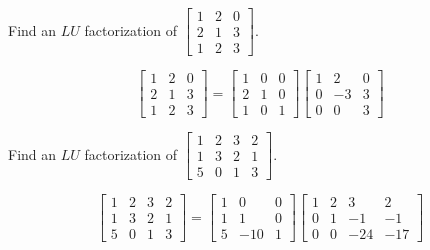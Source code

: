 \documentclass{ximera}
\begin{document}
\begin{problem}\label{prb:4.61} Find an $LU$ factorization of $\left[
\begin{array}{rrr}
1 & 2 & 0 \\
2 & 1 & 3 \\
1 & 2 & 3
\end{array}
\right] .$
\begin{hint}
\[
\left[
\begin{array}{ccc}
1 & 2 & 0 \\
2 & 1 & 3 \\
1 & 2 & 3
\end{array}
\right] = \left[
\begin{array}{ccc}
1 & 0 & 0 \\
2 & 1 & 0 \\
1 & 0 & 1
\end{array}
\right] \left[
\begin{array}{rrr}
1 & 2 & 0 \\
0 & -3 & 3 \\
0 & 0 & 3
\end{array}
\right]
\]

\end{hint}
\end{problem}

\begin{problem}\label{prb:4.62} Find an $LU$ factorization of $\left[
\begin{array}{rrrr}
1 & 2 & 3 & 2 \\
1 & 3 & 2 & 1 \\
5 & 0 & 1 & 3
\end{array}
\right] .$
\begin{hint}
\[
\left[
\begin{array}{cccc}
1 & 2 & 3 & 2 \\
1 & 3 & 2 & 1 \\
5 & 0 & 1 & 3
\end{array}
\right] = \left[
\begin{array}{rrr}
1 & 0 & 0 \\
1 & 1 & 0 \\
5 & -10 & 1
\end{array}
\right] \left[
\begin{array}{rrrr}
1 & 2 & 3 & 2 \\
0 & 1 & -1 & -1 \\
0 & 0 & -24 & -17
\end{array}
\right]
\]
\end{hint}
\end{problem}
\end{document}
